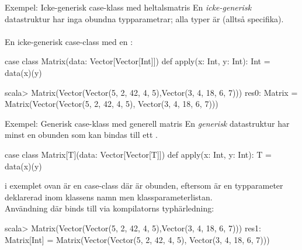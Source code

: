 



\begin{Slide}{Exempel: Icke-generisk case-klass med heltalsmatris}
  En \emph{icke-generisk} datastruktur har inga obundna typparametrar; alla typer är  (alltså specifika). \\~\\ En icke-generisk case-class med en :
  \begin{Code}
  case class Matrix(data: Vector[Vector[Int]]){
    def apply(x: Int, y: Int): Int = data(x)(y)
  }
  \end{Code}

  \begin{REPL}
  scala> Matrix(Vector(Vector(5, 2, 42, 4, 5),Vector(3, 4, 18, 6, 7)))
  res0: Matrix =
    Matrix(Vector(Vector(5, 2, 42, 4, 5), Vector(3, 4, 18, 6, 7)))
  \end{REPL}

\end{Slide}





\begin{Slide}{Exempel: Generisk case-klass med generell matris}
  En \emph{generisk} datastruktur har minst en obunden  som kan bindas  till ett  .
  
  \begin{Code}
  case class Matrix[T](data: Vector[Vector[T]]){
    def apply(x: Int, y: Int): T = data(x)(y)
  }
  \end{Code}
   i exemplet ovan är en  case-class där  är obunden, eftersom  är en typparameter deklarerad inom \code{[]}  klassens namn men  klassparameterlistan. \\

  \vspace{0.5em} Användning där  binds till  via kompilatorns typhärledning:
  \begin{REPL}
  scala> Matrix(Vector(Vector(5, 2, 42, 4, 5),Vector(3, 4, 18, 6, 7)))
  res1: Matrix[Int] =
    Matrix(Vector(Vector(5, 2, 42, 4, 5), Vector(3, 4, 18, 6, 7)))
  \end{REPL}

\end{Slide}




